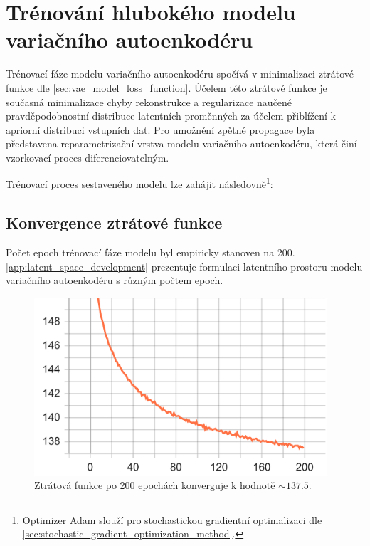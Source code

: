 \section{Trénování hlubokého modelu variačního autoenkodéru}
Trénovací fáze modelu variačního autoenkodéru spočívá v minimalizaci ztrátové funkce dle \autoref{sec:vae_model_loss_function}.
Účelem této ztrátové funkce je současná minimalizace chyby rekonstrukce a regularizace naučené pravděpodobnostní distribuce latentních proměnných za účelem přiblížení k apriorní distribuci vstupních dat.
Pro umožnění zpětné propagace byla představena reparametrizační vrstva modelu variačního autoenkodéru, která činí vzorkovací proces diferenciovatelným.

Trénovací proces sestaveného modelu lze zahájit následovně\footnote{Optimizer Adam slouží pro stochastickou gradientní optimalizaci dle \autoref{sec:stochastic_gradient_optimization_method}.}:


\subsection{Konvergence ztrátové funkce}
Počet epoch trénovací fáze modelu byl empiricky stanoven na 200. \autoref{app:latent_space_development} prezentuje formulaci latentního prostoru modelu variačního autoenkodéru s různým počtem epoch.
\begin{figure}[H]
    \centering
    \includegraphics[width=0.97\textwidth]{figures/epoch_total_loss.pdf}
    \caption{Ztrátová funkce po 200 epochách konverguje k hodnotě $\sim 137.5$.}
\end{figure}

